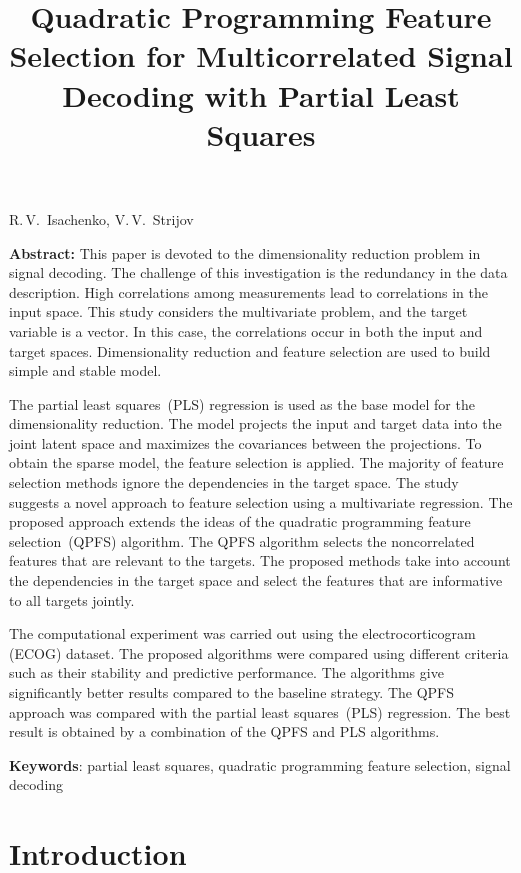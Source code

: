 \documentclass[12pt,twoside]{article}
\theoremstyle{definition}
\begin{document}
	
	\title{Quadratic Programming Feature Selection for Multicorrelated Signal Decoding with Partial Least Squares}
\date{}
\maketitle
\begin{center}
	R.\,V.~Isachenko,
	V.\,V.~Strijov
\end{center}
\textbf{Abstract:} 
This paper is devoted to the dimensionality reduction problem in signal decoding.
The challenge of this investigation is the redundancy in the data description. 
High correlations among measurements lead to correlations in the input space. 
This study considers the multivariate problem, and the target variable is a vector.
In this case, the correlations occur in both the input and target spaces.
Dimensionality reduction and feature selection are used to build simple and stable model.

The partial least squares~(PLS) regression is used as the base model for the dimensionality reduction.
The model projects the input and target data into the joint latent space and maximizes the covariances between the projections.
To obtain the sparse model, the feature selection is applied.
The majority of feature selection methods ignore the dependencies in the target space.
The study suggests a novel approach to feature selection using a multivariate regression.
The proposed approach extends the ideas of the quadratic programming feature selection~(QPFS) algorithm. 
The QPFS algorithm selects the noncorrelated features that are relevant to the targets. 
The proposed methods take into account the dependencies in the target space and select the features that are informative to all targets jointly.

The computational experiment was carried out using the electrocorticogram (ECOG) dataset. 
The proposed algorithms were compared using different criteria such as their stability and predictive performance.
The algorithms give significantly better results compared to the baseline strategy.
The QPFS approach was compared with the partial least squares~(PLS) regression.
The best result is obtained by a combination of the QPFS and PLS algorithms.

\bigskip
\textbf{Keywords}: partial least squares, quadratic programming feature selection, signal decoding

\section{Introduction}
\end{document}

